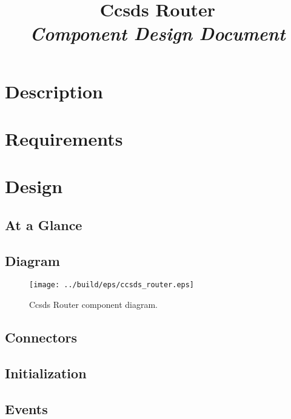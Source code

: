 



\title{\textbf{Ccsds Router} \\
\large\textit{Component Design Document}}
\date{}
\maketitle

\section{Description}


\section{Requirements}


\section{Design}

\subsection{At a Glance}


\subsection{Diagram}
\begin{figure}[H]
  \texttt{[image: ../build/eps/ccsds\_router.eps]}
  \caption{Ccsds Router component diagram.}
\end{figure}



\subsection{Connectors}


\subsection{Initialization}


\subsection{Events}

